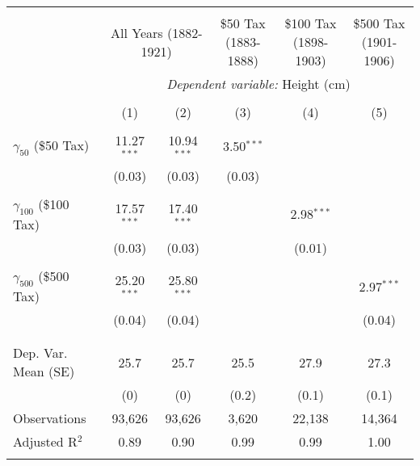 
\begin{tabular}{@{\extracolsep{5pt}}lccccc} 
\\[-1.8ex]\hline 
\hline \\[-1.8ex] 
 & \multicolumn{2}{c}{All Years (1882-1921)} & \$50 Tax (1883-1888) & \$100 Tax (1898-1903) & \$500 Tax (1901-1906) \\ 
 & \multicolumn{5}{c}{\textit{Dependent variable:} Height (cm)} \\ 
\cline{2-6} 
\\[-1.8ex] & (1) & (2) & (3) & (4) & (5)\\ 
\hline \\[-1.8ex] 
 $\gamma_{50}$ (\$50 Tax) & 11.27$^{***}$ & 10.94$^{***}$ & 3.50$^{***}$ &  &  \\ 
  & (0.03) & (0.03) & (0.03) &  &  \\ 
  & & & & & \\ 
 $\gamma_{100}$ (\$100 Tax) & 17.57$^{***}$ & 17.40$^{***}$ &  & 2.98$^{***}$ &  \\ 
  & (0.03) & (0.03) &  & (0.01) &  \\ 
  & & & & & \\ 
 $\gamma_{500}$ (\$500 Tax) & 25.20$^{***}$ & 25.80$^{***}$ &  &  & 2.97$^{***}$ \\ 
  & (0.04) & (0.04) &  &  & (0.04) \\ 
  & & & & & \\ 
\hline \\[-1.8ex] 
Dep. Var. Mean (SE) & 25.7 & 25.7 & 25.5 & 27.9 & 27.3 \\ 
 & (0) & (0) & (0.2) & (0.1) & (0.1) \\ 
Observations & 93,626 & 93,626 & 3,620 & 22,138 & 14,364 \\ 
Adjusted R$^{2}$ & 0.89 & 0.90 & 0.99 & 0.99 & 1.00 \\ 
\hline 
\hline \\[-1.8ex] 
\end{tabular} 
